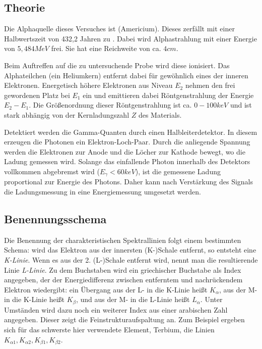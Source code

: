 \documentclass{../Misc/MontavonLaTeX/Montavon}
\begin{document}
\subsection{Theorie}
Die Alphaquelle dieses Versuches ist  (Americium). Dieses zerfällt mit einer Halbwertszeit von 432,2 Jahren zu \cite{nubase}. Dabei wird Alphastrahlung mit einer Energie von $5,484 \unit{MeV}$ frei. Sie hat eine Reichweite von ca. $4 \unit{cm}$\cite{anleitung}. 

Beim Auftreffen auf die zu untersuchende Probe wird diese ionisiert. Das Alphateilchen (ein Heliumkern) entfernt dabei für gewöhnlich eines der inneren Elektronen. Energetisch höhere Elektronen aus Niveau $E_2$ nehmen den frei gewordenen Platz bei $E_1$ ein und emittieren dabei Röntgenstrahlung der Energie $E_2 - E_1$. Die Größenordnung dieser Röntgenstrahlung ist ca. $0-100 \unit{keV}$ und ist stark abhängig von der Kernladungszahl $Z$ des Materials.

Detektiert werden die Gamma-Quanten durch einen Halbleiterdetektor. In diesem erzeugen die Photonen ein Elektron-Loch-Paar. Durch die anliegende Spannung werden die Elektronen zur Anode und die Löcher zur Kathode bewegt, wo die Ladung gemessen wird. 
Solange das einfallende Photon innerhalb des Detektors vollkommen abgebremst wird ($E_\gamma < 60 \unit{keV}$), ist die gemessene Ladung proportional zur Energie des Photons. 
Daher kann nach Verstärkung des Signals die Ladungsmessung in eine Energiemessung umgesetzt werden.

\subsection{Benennungsschema}

Die Benennung der charakteristischen Spektrallinien folgt einem bestimmten Schema: wird das Elektron aus der innersten (K-)Schale entfernt, so entsteht eine \emph{K-Linie}. Wenn es aus der 2. (L-)Schale entfernt wird, nennt man die resultierende Linie \emph{L-Linie}. 
Zu dem Buchstaben wird ein griechischer Buchstabe als Index angegeben, der der Energiedifferenz zwischen entferntem und nachrückendem Elektron wiedergibt: ein Übergang aus der L- in die K-Linie heißt $K_\alpha$, aus der M- in die K-Linie heißt $K_\beta$, und aus der M- in die L-Linie heißt $L_\alpha$.
Unter Umständen wird dazu noch ein weiterer Index aus einer arabischen Zahl angegeben. Dieser zeigt die Feinstrukturaufspaltung an. Zum Beispiel ergeben sich für das schwerste hier verwendete Element, Terbium, die Linien $K_{\alpha 1}, K_{\alpha 2}, K_{\beta 1}, K_{\beta 2}$.
\end{document}
